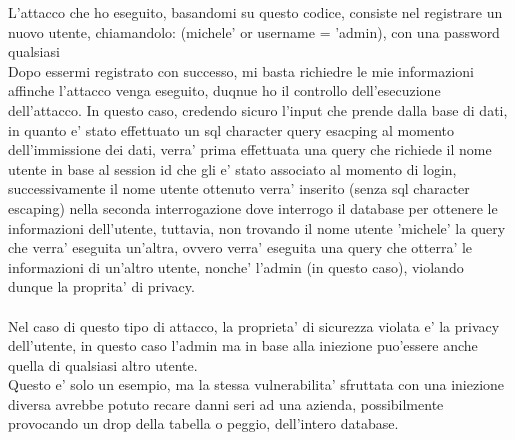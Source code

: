 \documentclass{book}
\begin{document}
L'attacco che ho eseguito, basandomi su questo codice, consiste nel registrare un nuovo utente, chiamandolo: (michele' or username = 'admin), con una password qualsiasi
\\
Dopo essermi registrato con successo, mi basta richiedre le mie informazioni affinche l'attacco venga eseguito, duqnue ho il controllo dell'esecuzione dell'attacco.
In questo caso, credendo sicuro l'input che prende dalla base di dati, in quanto e' stato effettuato un sql character query esacping al momento dell'immissione dei dati,
verra' prima effettuata una query che richiede il nome utente in base al session id che gli e' stato associato al momento di login, successivamente il nome utente ottenuto
verra' inserito (senza sql character escaping) nella seconda interrogazione dove interrogo il database per ottenere le informazioni dell'utente, tuttavia, non 
trovando il nome utente 'michele' la query che verra' eseguita un'altra, ovvero verra' eseguita una query che otterra' le informazioni di un'altro utente, nonche' l'admin (in questo caso), violando dunque la proprita' di privacy.
\\
\\
Nel caso di questo tipo di attacco, la proprieta' di sicurezza violata e' la privacy dell'utente, in questo caso l'admin
ma in base alla iniezione puo'essere anche quella di qualsiasi altro utente.
\\
Questo e' solo un esempio, ma la stessa vulnerabilita' sfruttata con una iniezione diversa avrebbe potuto recare danni
seri ad una azienda, possibilmente provocando un drop della tabella o peggio, dell'intero database.
\\
\end{document}
